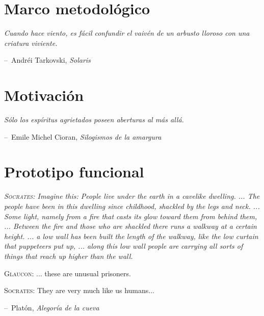 \documentclass[12pt,letterpaper,titlepage,oneside,openright]{book}
\makeatletter
\newenvironment{chapquote}[2][2em]
  {\setlength{\@tempdima}{#1}%
   \def\chapquote@author{#2}%
   \parshape 1 \@tempdima \dimexpr\textwidth-2\@tempdima\relax%
   \itshape}
  {\par\vspace{.5em}\normalfont\hfill--\ \chapquote@author\hspace*{\@tempdima}\par\bigskip}
\makeatother
\begin{document}
\frontmatter





\tableofcontents
\listoffigures
\listoftables

\newpage

\mainmatter




\chapter{Marco metodológico}

\begin{chapquote}{Andréi Tarkovski, \textit{Solaris}}
Cuando hace viento, es fácil confundir el vaivén de un arbusto lloroso con una criatura viviente.
\end{chapquote}

\lipsum[1-2]

\chapter{Motivación}

\begin{chapquote}{Emile Michel Cioran, \textit{Silogismos de la amargura}}
Sólo los espíritus agrietados poseen aberturas al más allá.
\end{chapquote}

\lipsum[1-2]

\chapter{Prototipo funcional}

\begin{chapquote}{Platón, \textit{Alegoría de la cueva}}
\textsc{Socrates}: Imagine this: People live under the earth in a cavelike dwelling. ... The people have been in this dwelling since childhood, shackled by the legs and neck. ... Some light, namely from a fire that casts its glow toward them from behind them, ... Between the fire and those who are shackled there runs a walkway at a certain height. ... a low wall has been built the length of the walkway, like the low curtain that puppeteers put up, ... along this low wall people are carrying all sorts of things that reach up higher than the wall.

\vspace{1em}

\textsc{Glaucon}: ... these are unusual prisoners.

\textsc{Socrates}: They are very much like us humans...
\end{chapquote}
\end{document}
